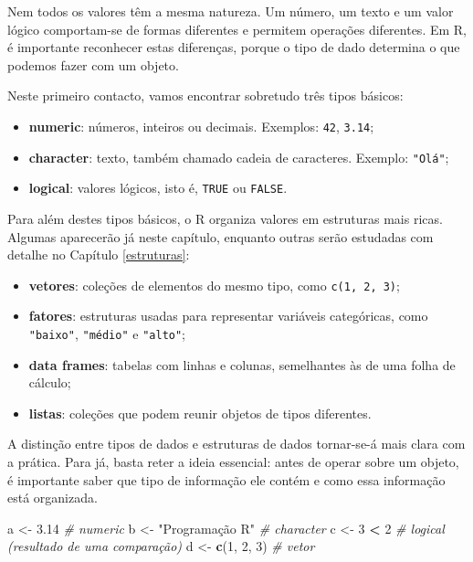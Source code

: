 \documentclass[
  portuguese,
  11pt,
  openany]{book}
\newenvironment{Shaded}{\begin{snugshade}}{\end{snugshade}}
\newcommand{\CommentTok}[1]{\textcolor[rgb]{0.56,0.35,0.01}{\textit{#1}}}
\newcommand{\DecValTok}[1]{\textcolor[rgb]{0.00,0.00,0.81}{#1}}
\newcommand{\FloatTok}[1]{\textcolor[rgb]{0.00,0.00,0.81}{#1}}
\newcommand{\FunctionTok}[1]{\textcolor[rgb]{0.13,0.29,0.53}{\textbf{#1}}}
\newcommand{\NormalTok}[1]{#1}
\newcommand{\OtherTok}[1]{\textcolor[rgb]{0.56,0.35,0.01}{#1}}
\newcommand{\SpecialCharTok}[1]{\textcolor[rgb]{0.81,0.36,0.00}{\textbf{#1}}}
\newcommand{\StringTok}[1]{\textcolor[rgb]{0.31,0.60,0.02}{#1}}
\providecommand{\tightlist}{%
  \setlength{\itemsep}{0pt}\setlength{\parskip}{0pt}}
\begin{document}
Nem todos os valores têm a mesma natureza. Um número, um texto e um valor lógico comportam-se de formas diferentes e permitem operações diferentes. Em R, é importante reconhecer estas diferenças, porque o tipo de dado determina o que podemos fazer com um objeto.

Neste primeiro contacto, vamos encontrar sobretudo três tipos básicos:

\begin{itemize}
\tightlist
\item
  \textbf{numeric}: números, inteiros ou decimais. Exemplos: \texttt{42}, \texttt{3.14};
\item
  \textbf{character}: texto, também chamado cadeia de caracteres. Exemplo: \texttt{"Olá"};
\item
  \textbf{logical}: valores lógicos, isto é, \texttt{TRUE} ou \texttt{FALSE}.
\end{itemize}

Para além destes tipos básicos, o R organiza valores em estruturas mais ricas. Algumas aparecerão já neste capítulo, enquanto outras serão estudadas com detalhe no Capítulo \ref{estruturas}:

\begin{itemize}
\tightlist
\item
  \textbf{vetores}: coleções de elementos do mesmo tipo, como \texttt{c(1,\ 2,\ 3)};
\item
  \textbf{fatores}: estruturas usadas para representar variáveis categóricas, como \texttt{"baixo"}, \texttt{"médio"} e \texttt{"alto"};
\item
  \textbf{data frames}: tabelas com linhas e colunas, semelhantes às de uma folha de cálculo;
\item
  \textbf{listas}: coleções que podem reunir objetos de tipos diferentes.
\end{itemize}

A distinção entre tipos de dados e estruturas de dados tornar-se-á mais clara com a prática. Para já, basta reter a ideia essencial: antes de operar sobre um objeto, é importante saber que tipo de informação ele contém e como essa informação está organizada.

\begin{Shaded}
\begin{Highlighting}[]
\NormalTok{a }\OtherTok{\textless{}{-}} \FloatTok{3.14}                \CommentTok{\# numeric}
\NormalTok{b }\OtherTok{\textless{}{-}} \StringTok{"Programação R"}     \CommentTok{\# character}
\NormalTok{c }\OtherTok{\textless{}{-}} \DecValTok{3} \SpecialCharTok{\textless{}} \DecValTok{2}               \CommentTok{\# logical (resultado de uma comparação)}
\NormalTok{d }\OtherTok{\textless{}{-}} \FunctionTok{c}\NormalTok{(}\DecValTok{1}\NormalTok{, }\DecValTok{2}\NormalTok{, }\DecValTok{3}\NormalTok{)          }\CommentTok{\# vetor}
\end{Highlighting}
\end{Shaded}
\end{document}
